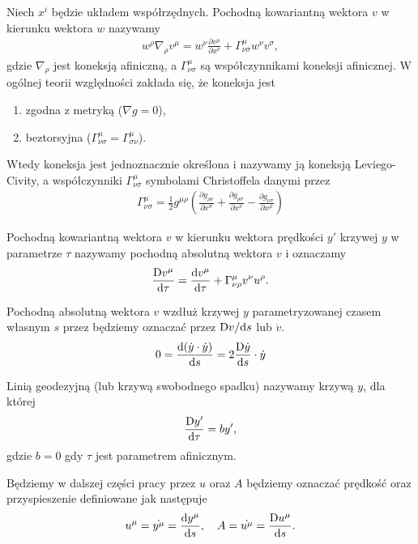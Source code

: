 \begin{definition}
Niech $x^i$ będzie układem współrzędnych. 
Pochodną kowariantną wektora $v$ w kierunku wektora $w$ nazywamy
\begin{align*}
w^\rho \nabla_\rho v^\mu = w^\nu \frac{\partial v^\mu}{\partial x^\nu}
+ \Gamma^\mu_{\nu\sigma} w^\nu v^\sigma ,
\end{align*}
gdzie $\nabla_\rho$ jest koneksją afiniczną, a $\Gamma^\mu_{\nu\sigma} $
są współczynnikami koneksji afinicznej. W ogólnej teorii względności 
zakłada się, że koneksja jest
\begin{enumerate}
    \item zgodna z metryką ($\nabla g =0$),
    \item beztorsyjna ($\Gamma^\mu_{\nu\sigma} 
        = \Gamma^\mu_{\sigma\nu}$).
\end{enumerate} 
Wtedy koneksja jest jednoznacznie określona i nazywamy ją
 koneksją Leviego-Civity, a współczynniki 
$\Gamma^\mu_{\nu\sigma}$ symbolami Christoffela danymi przez
\begin{align*}
\Gamma^\mu_{\nu\sigma} = \frac{1}{2} g^{\mu\rho} 
\left(\frac{\partial g_{\rho\nu}}{\partial x^\sigma}+ 
\frac{\partial g_{\rho\sigma}}{\partial x^\nu}-
\frac{\partial g_{\nu\sigma}}{\partial x^\rho}\right)
\end{align*}
\end{definition}
\begin{definition}
Pochodną kowariantną wektora $v$ w kierunku wektora prędkości
$y'$ krzywej $y$ w parametrze $\tau$ nazywamy
pochodną absolutną wektora $v$ i oznaczamy 
\begin{align*}
\frac{\text{D} v^\mu }{\text{d} \tau } = \frac{\text{d} v^\mu}{\text{d} \tau}
+ \Gamma^\mu_{\nu\rho} v^\nu u^\rho.
\end{align*}
\end{definition}
Pochodną absolutną wektora $v$ wzdłuż krzywej $y$
parametryzowanej czasem własnym $s$
przez będziemy oznaczać przez $\text{D} v/\text{d} s$ lub $\dot{v}$. 
\begin{align*}
0 = \frac{\text{d} (\dot{y} \cdot \dot{y}) }{\text{d} s} = 
2 \frac{\text{D} \dot{y}}{\text{d} s} \cdot \dot{y}
\end{align*}
\begin{definition}
Linią geodezyjną (lub krzywą swobodnego spadku) nazywamy 
krzywą $y$, dla której
\begin{align*}
\frac{\text{D} y'}{\text{d} \tau } = b y',
\end{align*} 
gdzie $b=0$ gdy $\tau$ jest parametrem afinicznym.
\end{definition}
Będziemy w dalszej części pracy przez $u$ oraz $A$ będziemy oznaczać
prędkość oraz przyspieszenie definiowane jak następuje
\begin{align*}
u^\mu = \dot{y^\mu} = \frac{\text{d} y^\mu}{\text{d} s}, 
\quad A = \dot{u^\mu} =  \frac{\text{D} u^\mu}{\text{d} s}.
\end{align*}




